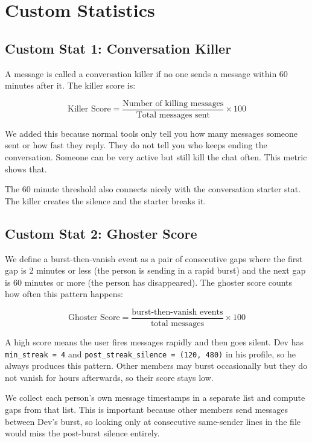 \documentclass{article}
\begin{document}
\section{Custom Statistics}

\subsection*{Custom Stat 1: Conversation Killer}

A message is called a conversation killer if no one sends a message within 60 minutes after it. The killer score is:

\[
\text{Killer Score} = \frac{\text{Number of killing messages}}{\text{Total messages sent}} \times 100
\]

We added this because normal tools only tell you how many messages someone sent or how fast they reply. They do not tell you who keeps ending the conversation. Someone can be very active but still kill the chat often. This metric shows that.

The 60 minute threshold also connects nicely with the conversation starter stat. The killer creates the silence and the starter breaks it.

\subsection*{Custom Stat 2: Ghoster Score}

We define a burst-then-vanish event as a pair of consecutive gaps where the first gap is 2 minutes or less (the person is sending in a rapid burst) and the next gap is 60 minutes or more (the person has disappeared). The ghoster score counts how often this pattern happens:

\[
\text{Ghoster Score} = \frac{\text{burst-then-vanish events}}{\text{total messages}} \times 100
\]

A high score means the user fires messages rapidly and then goes silent. Dev has \texttt{min\_streak = 4} and \texttt{post\_streak\_silence = (120, 480)} in his profile, so he always produces this pattern. Other members may burst occasionally but they do not vanish for hours afterwards, so their score stays low.

We collect each person's own message timestamps in a separate list and compute gaps from that list. This is important because other members send messages between Dev's burst, so looking only at consecutive same-sender lines in the file would miss the post-burst silence entirely.
\end{document}
